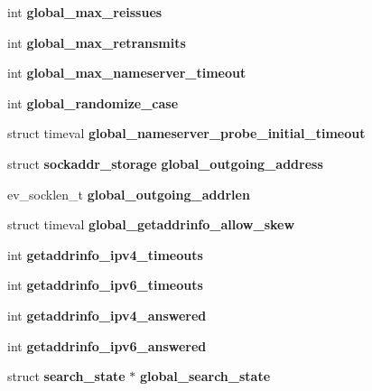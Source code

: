 \begin{DoxyCompactItemize}
\item 
int {\bfseries global\-\_\-max\-\_\-reissues}\label{structevdns__base_a7ec1fc4be6adc7f6bf5d0554c855813f}

\item 
int {\bfseries global\-\_\-max\-\_\-retransmits}\label{structevdns__base_a9e43a32f2b78a9661bf25ec377e81150}

\item 
int {\bfseries global\-\_\-max\-\_\-nameserver\-\_\-timeout}\label{structevdns__base_a63bc5f91b26f4dc33d9f7476a04342b3}

\item 
int {\bfseries global\-\_\-randomize\-\_\-case}\label{structevdns__base_ab03dcd0b6a96d1c9f463ffe073c04993}

\item 
struct timeval {\bfseries global\-\_\-nameserver\-\_\-probe\-\_\-initial\-\_\-timeout}\label{structevdns__base_a145de962a6eafb9ce56752af88eea05b}

\item 
struct {\bf sockaddr\-\_\-storage} {\bf global\-\_\-outgoing\-\_\-address}
\item 
ev\-\_\-socklen\-\_\-t {\bf global\-\_\-outgoing\-\_\-addrlen}
\item 
struct timeval {\bfseries global\-\_\-getaddrinfo\-\_\-allow\-\_\-skew}\label{structevdns__base_a41073cdb788ce23e25c711ad104d3c77}

\item 
int {\bfseries getaddrinfo\-\_\-ipv4\-\_\-timeouts}\label{structevdns__base_a6be911cb2ebcd7b46750fca85be9df6b}

\item 
int {\bfseries getaddrinfo\-\_\-ipv6\-\_\-timeouts}\label{structevdns__base_a71a08e742b90785d2043dcc0d6e1a98d}

\item 
int {\bfseries getaddrinfo\-\_\-ipv4\-\_\-answered}\label{structevdns__base_aecb262b62d5f8c7d7f7a2605ead26946}

\item 
int {\bfseries getaddrinfo\-\_\-ipv6\-\_\-answered}\label{structevdns__base_af0f0b518d1722937fd2fc2e25e872e49}

\item 
struct {\bf search\-\_\-state} $\ast$ {\bfseries global\-\_\-search\-\_\-state}\label{structevdns__base_a8a4347dfded727159ed7ee0ed98f6e3c}

\end{DoxyCompactItemize}


